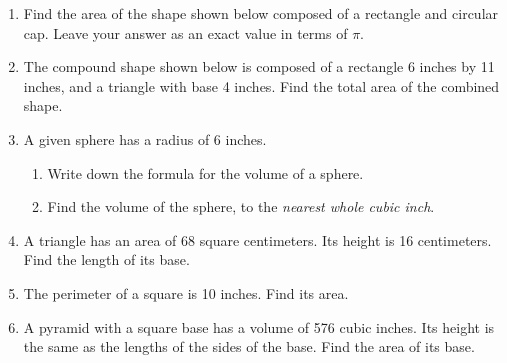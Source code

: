 \documentclass[12pt, twoside]{article}
\begin{document}
\begin{enumerate}
\item Find the area of the shape shown below composed of a rectangle and circular cap. Leave your answer as an exact value in terms of $\pi$.
\begin{flushright}
\end{flushright}

\item The compound shape shown below is composed of a rectangle 6 inches by 11 inches, and a triangle with base 4 inches. Find the total area of the combined shape.
    \vspace{0.5cm} 
    \begin{flushleft}
    \end{flushleft}

\newpage
\item A given sphere has a radius of 6 inches.
\begin{enumerate}
  \item Write down the formula for the volume of a sphere. \vspace{1cm}
  \item Find the volume of the sphere, to the \emph{nearest whole cubic inch}.
\end{enumerate}  \vspace{3cm}

\item A triangle has an area of 68 square centimeters. Its height is 16 centimeters. Find the length of its base. \vspace{3cm}

\item The perimeter of a square is 10 inches. Find its area. \vspace{4cm}

\item A pyramid with a square base has a volume of 576 cubic inches. Its height is the same as the lengths of the sides of the base. Find the area of its base.
  
\end{enumerate}
\end{document}
